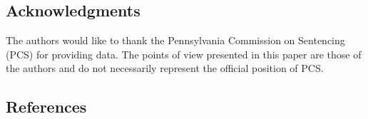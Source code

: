 \documentclass[
  letterpaper,
  DIV=11,
  numbers=noendperiod]{scrartcl}
\begin{document}
\hypertarget{acknowledgments}{%
\subsection{Acknowledgments}\label{acknowledgments}}

The authors would like to thank the Pennsylvania Commission on
Sentencing (PCS) for providing data. The points of view presented in
this paper are those of the authors and do not necessarily represent the
official position of PCS.

\newpage

\hypertarget{references}{%
\subsection*{References}\label{references}}
\end{document}
